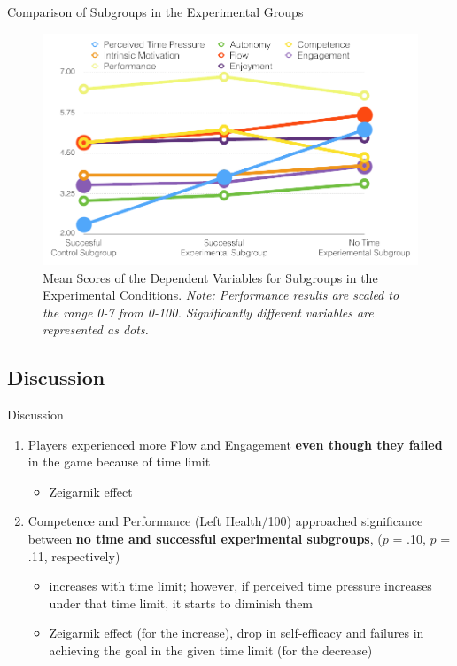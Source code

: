 \documentclass{beamer}
\begin{document}
\begin{frame}{Comparison of Subgroups in the Experimental Groups} 
\begin{figure}[h]
\centering
\includegraphics [width=.8\textwidth,clip]{images/Figure_4_Results}
\captionsetup{labelfont=bf, justification=justified,singlelinecheck=false,skip=0pt,belowskip=0pt}
\caption[meanscores]{\fontsize{6.5pt}{6.5}\selectfont Mean Scores of the Dependent Variables for Subgroups in the Experimental Conditions. \it {Note: Performance results are scaled to the range 0-7 from 0-100. Significantly different variables are represented as dots.}}
\label {fig:meanscores}
\end{figure}
\end{frame}

\subsection{Discussion}
\begin{frame}{Discussion}
\begin{enumerate}
\item Players experienced more \alert{Flow} and \alert{Engagement} \textbf{even though they failed} in the game because of time limit
	\begin{itemize}
	\item Zeigarnik effect
	\end{itemize}
\item \alert{Competence} and \alert{Performance} (Left Health/100) approached significance between \textbf{no time and successful experimental subgroups}, ($p$ = .10, $p$ = .11, respectively)
	\begin{itemize}
		\item increases with time limit; however, if perceived time pressure increases under that time limit, it starts to diminish them
		\item Zeigarnik effect (for the increase), drop in self-efficacy and failures in achieving the goal in the given time limit (for the decrease)
	\end{itemize}
\end{enumerate}
\end{frame}
\end{document}
